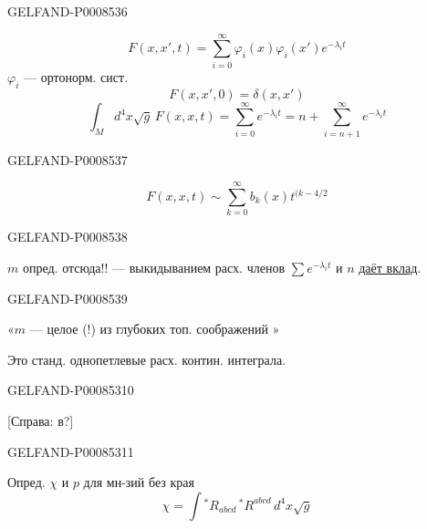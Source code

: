 \begin{GelfandAdjacentEvidence}{GELFAND-P000853}{6}

\[
F(x,x',t)=\sum_{i=0}^{\infty}\varphi_i(x)\varphi_i(x')e^{-\lambda_i t}\tag{40}
\]
\(\varphi_i\) — ортонорм. сист.
\[
F(x,x',0)=\delta(x,x')\tag{41}
\]
\[
\int_M d^4x\sqrt{g}\,F(x,x,t)
=\sum_{i=0}^{\infty}e^{-\lambda_i t}
=n+\sum_{i=n+1}^{\infty}e^{-\lambda_i t}\tag{42}
\]
\end{GelfandAdjacentEvidence}
\begin{GelfandAdjacentEvidence}{GELFAND-P000853}{7}

\[
F(x,x,t)\sim\sum_{k=0}^{\infty}b_k(x)t^{(k-4/2}\tag{43}
\]
\end{GelfandAdjacentEvidence}
\begin{GelfandAdjacentEvidence}{GELFAND-P000853}{8}


\(m\) опред. отсюда!! — выкидыванием расх. членов \(\sum e^{-\lambda_i t}\) и \(n\) \uline{даёт вклад}.

\end{GelfandAdjacentEvidence}
\begin{GelfandAdjacentEvidence}{GELFAND-P000853}{9}


«\(m\) — целое (!) из глубоких топ. соображений »

Это станд. однопетлевые расх. контин. интеграла.
\end{GelfandAdjacentEvidence}
\begin{GelfandAdjacentEvidence}{GELFAND-P000853}{10}


[Справа: в?]
\end{GelfandAdjacentEvidence}
\begin{GelfandAdjacentEvidence}{GELFAND-P000853}{11}


Опред. \(\chi\) и \(p\) для мн-зий без края
\[
\chi=\int {}^*R_{abcd}\,{}^*R^{abcd}\,d^4x\sqrt{g}\tag{44}
\]
\end{GelfandAdjacentEvidence}

